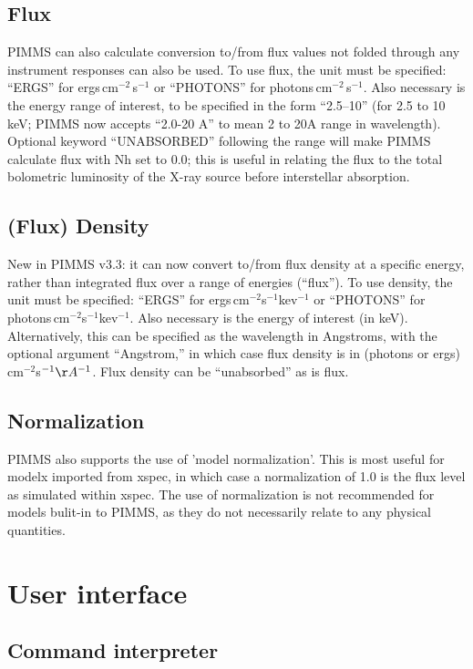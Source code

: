 \subsection{Flux}

PIMMS can also calculate conversion to/from flux values not folded through
any instrument responses can also be used.  To use flux, the unit must be
specified: ``ERGS'' for ergs\,cm$^{-2}$\,s$^{-1}$ or ``PHOTONS'' for
photons\,cm$^{-2}$\,s$^{-1}$.  Also necessary is the energy
range of interest, to be specified in the form ``2.5--10'' (for 2.5 to 10 keV;
PIMMS now accepts ``2.0-20 A'' to mean 2 to 20A range in wavelength).
Optional keyword ``UNABSORBED'' following the range will make PIMMS calculate
flux with Nh set to 0.0; this is useful in relating the flux to the total
bolometric luminosity of the X-ray source before interstellar absorption.

\subsection{(Flux) Density}

New in PIMMS v3.3: it can now convert to/from flux density at a specific
energy, rather than integrated flux over a range of energies (``flux'').
To use density, the unit must be specified: ``ERGS'' for
ergs\,cm$^{-2}$s$^{-1}$kev$^{-1}$ or ``PHOTONS'' for
photons\,cm$^{-2}$s$^{-1}$kev$^{-1}$.  Also necessary is the energy of
interest (in keV).  Alternatively, this can be specified as the wavelength
in Angstroms, with the optional argument ``Angstrom,'' in which case flux
density is in (photons or ergs)\,cm$^{-2}$s$^{-1}\AA^{-1}$.
Flux density can be ``unabsorbed'' as is flux.

\subsection{Normalization}

PIMMS also supports the use of 'model normalization'.  This is most useful
for modelx imported from xspec, in which case a normalization of 1.0 is
the flux level as simulated within xspec.  The use of normalization is not
recommended for models bulit-in to PIMMS, as they do not necessarily relate
to any physical quantities.

\section{User interface}

\subsection{Command interpreter}

